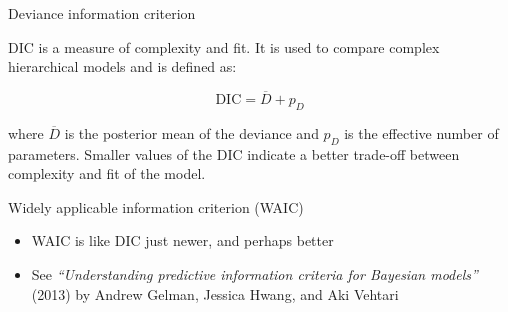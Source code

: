 \documentclass[
  ignorenonframetext,
]{beamer}
\newenvironment{Shaded}{\begin{snugshade}}{\end{snugshade}}
\newcommand{\AttributeTok}[1]{\textcolor[rgb]{0.77,0.63,0.00}{#1}}
\newcommand{\CommentTok}[1]{\textcolor[rgb]{0.56,0.35,0.01}{\textit{#1}}}
\newcommand{\ConstantTok}[1]{\textcolor[rgb]{0.00,0.00,0.00}{#1}}
\newcommand{\FunctionTok}[1]{\textcolor[rgb]{0.00,0.00,0.00}{#1}}
\newcommand{\NormalTok}[1]{#1}
\newcommand{\OtherTok}[1]{\textcolor[rgb]{0.56,0.35,0.01}{#1}}
\newcommand{\SpecialCharTok}[1]{\textcolor[rgb]{0.00,0.00,0.00}{#1}}
\begin{document}
\begin{frame}[fragile]{Deviance information criterion}
\protect\hypertarget{deviance-information-criterion}{}
\small

\begin{Shaded}
\end{Shaded}

\normalsize

\hfill\break
\hfill\break
DIC is a measure of complexity and fit. It is used to compare complex
hierarchical models and is defined as:

\[
\text{DIC} = \overline{D} + p_D
\]

where \(\overline{D}\) is the posterior mean of the deviance and \(p_D\)
is the effective number of parameters. Smaller values of the DIC
indicate a better trade-off between complexity and fit of the model.
\end{frame}

\begin{frame}[fragile]{Widely applicable information criterion (WAIC)}
\protect\hypertarget{widely-applicable-information-criterion-waic}{}
\small

\begin{Shaded}
\end{Shaded}

\normalsize

\begin{itemize}
\item
  WAIC is like DIC just newer, and perhaps better
\item
  See \emph{``Understanding predictive information criteria for Bayesian
  models''} (2013) by Andrew Gelman, Jessica Hwang, and Aki Vehtari
\end{itemize}
\end{frame}
\end{document}
